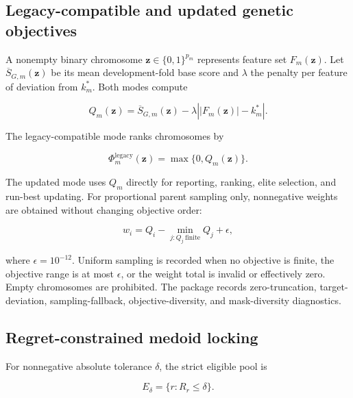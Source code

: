 \subsection{Legacy-compatible and updated genetic objectives}

A nonempty binary chromosome \(\mathbf z\in\{0,1\}^{p_m}\) represents feature set \(F_m(\mathbf z)\). Let \(\overline S_{G,m}(\mathbf z)\) be its mean development-fold base score and \(\lambda\) the penalty per feature of deviation from \(k_m^{\ast}\). Both modes compute

\begin{equation}
Q_m(\mathbf z)=\overline S_{G,m}(\mathbf z)-\lambda\left||F_m(\mathbf z)|-k_m^{\ast}\right|.
\label{eq:raw-objective}
\end{equation}

The legacy-compatible mode ranks chromosomes by

\begin{equation}
\Phi_m^{\mathrm{legacy}}(\mathbf z)=\max\{0,Q_m(\mathbf z)\}.
\label{eq:legacy-fitness}
\end{equation}

The updated mode uses \(Q_m\) directly for reporting, ranking, elite selection, and run-best updating. For proportional parent sampling only, nonnegative weights are obtained without changing objective order:

\begin{equation}
w_i=Q_i-\min_{j:Q_j\ \mathrm{finite}}Q_j+\epsilon,
\label{eq:shifted-weight}
\end{equation}

where \(\epsilon=10^{-12}\). Uniform sampling is recorded when no objective is finite, the objective range is at most \(\epsilon\), or the weight total is invalid or effectively zero. Empty chromosomes are prohibited. The package records zero-truncation, target-deviation, sampling-fallback, objective-diversity, and mask-diversity diagnostics.

\subsection{Regret-constrained medoid locking}

For nonnegative absolute tolerance \(\delta\), the strict eligible pool is

\begin{equation}
E_\delta=\{r:R_r\leq\delta\}.
\label{eq:eligible-pool}
\end{equation}

